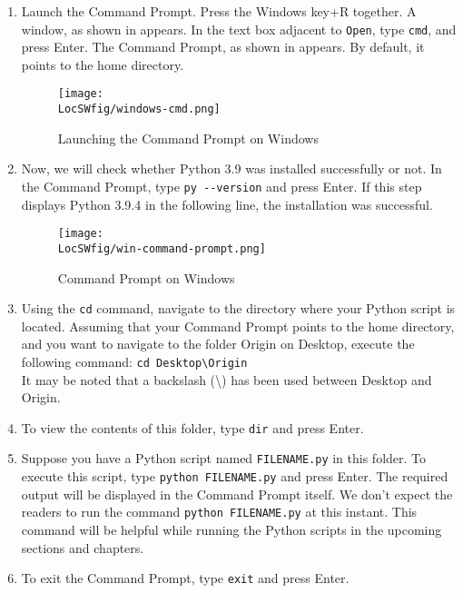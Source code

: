 \begin{enumerate}
      \item Launch the Command Prompt. Press the Windows key+R together. 
      A window, as shown in  appears. In the text box adjacent to {\tt Open}, type {\tt cmd}, 
      and press Enter. The Command Prompt, as shown in  appears. 
      By default, it points to the home directory.  
      \begin{figure}
            \centering
            \texttt{[image: \\LocSWfig/windows-cmd.png]}
            \caption{Launching the Command Prompt on Windows}
            \label{windows-run}
      \end{figure}
      \item Now, we will check whether Python 3.9 was installed 
      successfully or not. In the Command Prompt, type {\tt py -{}-version} and 
      press Enter. If this step displays Python 3.9.4 in the following line, 
      the installation was successful. 
      \begin{figure}
            \centering
            \texttt{[image: \\LocSWfig/win-command-prompt.png]}
            \caption{Command Prompt on Windows}
            \label{windows-cmd}
      \end{figure}
      \item Using the {\tt cd} command, navigate to the directory where your Python 
      script is located. Assuming that your Command Prompt points to the 
      home directory, and you want to navigate to the folder Origin on 
      Desktop, execute the following command: {\tt cd Desktop\textbackslash Origin} \\
      It may be noted that a backslash (\textbackslash) has been used between 
      Desktop and Origin. 
      \item To view the contents of this folder, type {\tt dir} and press Enter.
      \item Suppose you have a Python script named  {\tt FILENAME.py} in this 
      folder. To execute this script, type {\tt python FILENAME.py} and press 
      Enter. The required output will be displayed in the Command Prompt itself. 
      We don’t expect the readers to run the command {\tt python FILENAME.py} at 
      this instant. This command will be helpful while running the Python 
      scripts in the upcoming sections and chapters. 
      \item To exit the Command Prompt, type {\tt exit} and press Enter. 
 
\end{enumerate}

